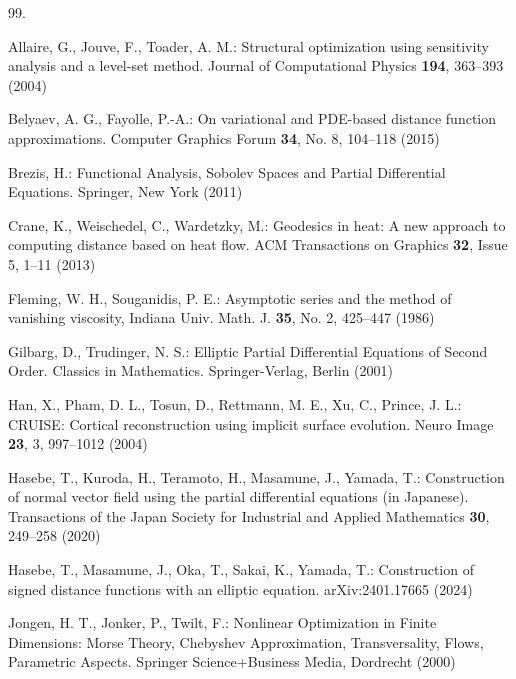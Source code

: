 \documentclass[graybox]{svmult}
\begin{document}
\begin{thebibliography}{99.}%




 Allaire, G.,  Jouve, F., Toader, A. M.: 
Structural optimization using sensitivity analysis
and a level-set method. Journal of Computational Physics \textbf{194},  363--393 (2004)


 Belyaev, A. G., Fayolle, P.-A.: On variational and PDE-based distance function approximations.  
Computer Graphics Forum \textbf{34}, No. 8, 104--118   (2015)


  Brezis, H.:
       Functional Analysis, Sobolev Spaces and Partial Differential Equations. Springer, New York (2011)

	Crane, K., Weischedel, C., Wardetzky, M.: 
	Geodesics in heat: A new approach to computing distance based on heat flow. 
	ACM Transactions on Graphics {\textbf{32}}, Issue 5, 1--11 (2013)
	
	 Fleming, W. H., Souganidis, P. E.: Asymptotic series and the method of vanishing viscosity,  Indiana Univ. Math. J. {\bf 35}, No. 2, 425--447 (1986) 

    Gilbarg, D.,  Trudinger, N. S.: Elliptic Partial Differential Equations of Second Order.  Classics in Mathematics. Springer-Verlag, Berlin (2001) %


        
	Han, X., Pham, D. L., Tosun, D., Rettmann, M. E., Xu, C., Prince, J. L.: 
	CRUISE: Cortical reconstruction using implicit surface evolution. 
	Neuro Image {\textbf{23}}, 3, 997--1012 (2004)


 Hasebe, T.,  Kuroda, H., Teramoto, H.,  Masamune, J., Yamada, T.: Construction of normal vector field using the partial differential equations (in Japanese). Transactions of the Japan Society for Industrial and Applied Mathematics \textbf{30}, 249--258 (2020) 

 Hasebe, T.,  Masamune, J.,  Oka, T., Sakai, K., Yamada, T.:  Construction of signed distance functions with an elliptic equation. arXiv:2401.17665 (2024) 

  Jongen, H. T., Jonker, P., Twilt, F.:  Nonlinear Optimization in Finite Dimensions: Morse Theory, Chebyshev Approximation, Transversality, Flows, Parametric Aspects. Springer Science+Business Media, Dordrecht  (2000)



\end{thebibliography}
\end{document}
